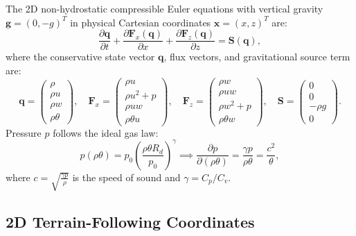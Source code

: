 \documentclass[11pt,a4paper]{article}
\begin{document}
	The 2D non-hydrostatic compressible Euler equations with vertical gravity $\boldsymbol{g} = (0, -g)^T$ in physical Cartesian coordinates $\boldsymbol{x} = (x, z)^T$ are:
	\begin{equation}
		\frac{\partial \boldsymbol{q}}{\partial t} + \frac{\partial \mathbf{F}_x(\boldsymbol{q})}{\partial x} + \frac{\partial \mathbf{F}_z(\boldsymbol{q})}{\partial z} = \boldsymbol{S}(\boldsymbol{q}),
	\end{equation}
	where the conservative state vector $\boldsymbol{q}$, flux vectors, and gravitational source term are:
	\begin{equation}
		\boldsymbol{q} = \begin{pmatrix} \rho \\[2pt] \rho u \\[2pt] \rho w \\[2pt] \rho \theta \end{pmatrix}, \quad 
		\mathbf{F}_x = \begin{pmatrix} \rho u \\[2pt] \rho u^2 + p \\[2pt] \rho u w \\[2pt] \rho \theta u \end{pmatrix}, \quad 
		\mathbf{F}_z = \begin{pmatrix} \rho w \\[2pt] \rho u w \\[2pt] \rho w^2 + p \\[2pt] \rho \theta w \end{pmatrix}, \quad 
		\boldsymbol{S} = \begin{pmatrix} 0 \\[2pt] 0 \\[2pt] -\rho g \\[2pt] 0 \end{pmatrix}.
	\end{equation}
	Pressure $p$ follows the ideal gas law:
	\begin{equation}
		p(\rho\theta) = p_0 \left( \frac{\rho\theta R_d}{p_0} \right)^\gamma \implies \frac{\partial p}{\partial (\rho\theta)} = \frac{\gamma p}{\rho\theta} = \frac{c^2}{\theta},
	\end{equation}
	where $c = \sqrt{\frac{\gamma p}{\rho}}$ is the speed of sound and $\gamma = C_p / C_v$.
	
	
	\subsection{2D Terrain-Following Coordinates}
	
\end{document}
